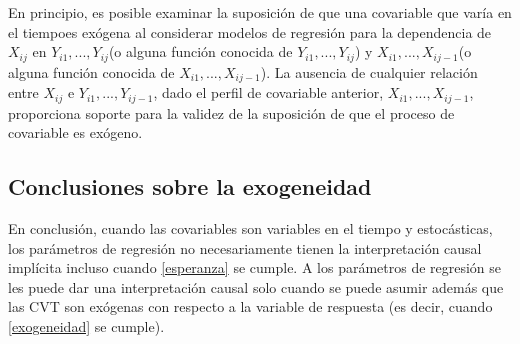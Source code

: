 \documentclass[12pt]{article}
\def\cvt{covariable que varía en el tiempo}
\def\xseqjminus{$X_{i1}, ..., X_{ij-1}$}
\def\yseqj{$Y_{i1}, ..., Y_{ij}$}
\def\yseqjminus{$Y_{i1}, ..., Y_{ij-1}$}
\begin{document}
En principio, es posible examinar la suposición de que una \cvt es exógena al considerar modelos de regresión para la 
dependencia de $X_{ij}$ en \yseqj (o alguna función conocida de \yseqj) y \xseqjminus (o alguna función 
conocida de \xseqjminus). La ausencia de cualquier relación entre $X_{ij}$ e \yseqjminus, dado 
el perfil de covariable anterior, \xseqjminus, proporciona soporte para la validez de la suposición de que 
el proceso de covariable es exógeno.

\subsection{Conclusiones sobre la exogeneidad}

En conclusión, cuando las covariables son variables en el tiempo y estocásticas, los parámetros de regresión no 
necesariamente tienen la interpretación causal implícita incluso cuando \ref{esperanza} se cumple. A los parámetros de 
regresión se les puede dar una interpretación causal solo cuando se puede asumir además que las CVT son exógenas con 
respecto a la variable de respuesta (es decir, cuando \ref{exogeneidad} se cumple).
\end{document}
